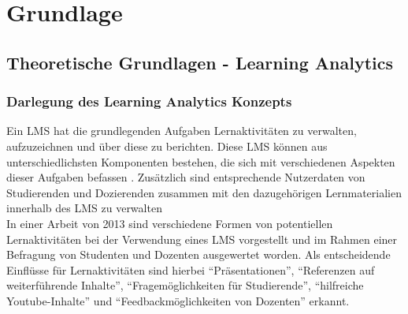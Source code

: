 \chapter{Grundlage} %

\section{Theoretische Grundlagen - Learning Analytics}

\subsection{Darlegung des Learning Analytics Konzepts}

Ein \ac{LMS} hat die grundlegenden Aufgaben Lernaktivitäten zu verwalten, aufzuzeichnen und über diese zu berichten. Diese \ac{LMS} können aus unterschiedlichsten Komponenten bestehen, die sich mit verschiedenen Aspekten dieser Aufgaben befassen \autocite[S.1]{learningManagementSystemsFieldGuide}. Zusätzlich sind entsprechende Nutzerdaten von Studierenden und Dozierenden zusammen mit den dazugehörigen Lernmaterialien innerhalb des \ac{LMS} zu verwalten \autocite{learningManagementSystemDefinition}\\
In einer Arbeit von 2013 \autocite[S.253]{SCHOONENBOOM2014247} sind verschiedene Formen von potentiellen Lernaktivitäten bei der Verwendung eines \ac{LMS} vorgestellt und im Rahmen einer Befragung von Studenten und Dozenten ausgewertet worden. Als entscheidende Einflüsse für Lernaktivitäten sind hierbei \enquote{Präsentationen}, \enquote{Referenzen auf weiterführende Inhalte}, \enquote{Fragemöglichkeiten für Studierende}, \enquote{hilfreiche Youtube-Inhalte} und \enquote{Feedbackmöglichkeiten von Dozenten} erkannt.

